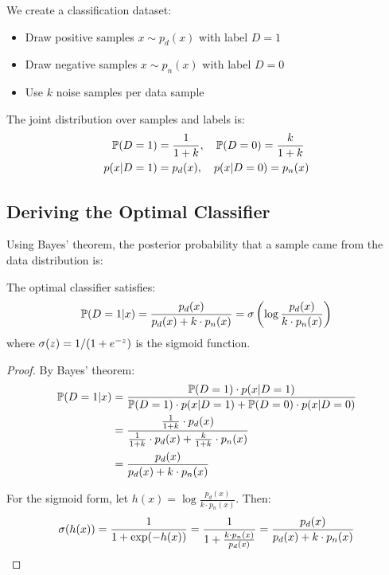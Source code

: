 \begin{notechapter}
We create a classification dataset:
\begin{itemize}
    \item Draw positive samples $x \sim p_d(x)$ with label $D = 1$
    \item Draw negative samples $x \sim p_n(x)$ with label $D = 0$
    \item Use $k$ noise samples per data sample
\end{itemize}

\begin{definition}
The joint distribution over samples and labels is:
\begin{align}
\mathbb{P}(D = 1) &= \frac{1}{1+k}, \quad \mathbb{P}(D = 0) = \frac{k}{1+k} \\
p(x | D = 1) &= p_d(x), \quad p(x | D = 0) = p_n(x)
\end{align}
\end{definition}

\subsection{Deriving the Optimal Classifier}

Using Bayes' theorem, the posterior probability that a sample came from the data distribution is:

\begin{theorem}
\label{contrastive-rigorous:thm:nce_optimal}
The optimal classifier satisfies:
\begin{equation}
\mathbb{P}(D = 1 | x) = \frac{p_d(x)}{p_d(x) + k \cdot p_n(x)} = \sigma\left(\log \frac{p_d(x)}{k \cdot p_n(x)}\right)
\end{equation}
where $\sigma(z) = 1/(1 + e^{-z})$ is the sigmoid function.
\end{theorem}

\begin{proof}
By Bayes' theorem:
\begin{align}
\mathbb{P}(D = 1 | x) &= \frac{\mathbb{P}(D=1) \cdot p(x|D=1)}{\mathbb{P}(D=1) \cdot p(x|D=1) + \mathbb{P}(D=0) \cdot p(x|D=0)} \\
&= \frac{\frac{1}{1+k} \cdot p_d(x)}{\frac{1}{1+k} \cdot p_d(x) + \frac{k}{1+k} \cdot p_n(x)} \\
&= \frac{p_d(x)}{p_d(x) + k \cdot p_n(x)}
\end{align}

For the sigmoid form, let $h(x) = \log \frac{p_d(x)}{k \cdot p_n(x)}$. Then:
\begin{equation}
\sigma(h(x)) = \frac{1}{1 + \exp(-h(x))} = \frac{1}{1 + \frac{k \cdot p_n(x)}{p_d(x)}} = \frac{p_d(x)}{p_d(x) + k \cdot p_n(x)}
\end{equation}
\end{proof}


\end{notechapter}
